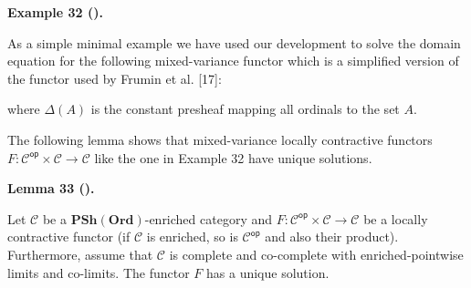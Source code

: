 \documentclass[10pt,a4paper]{article}
\begin{document}
 
 
\par\medskip\noindent\textbf{Example 32 ().}\par
 
 
As a simple minimal example we have used our development to solve the domain equation for the following mixed-variance functor which is a simplified version of the functor used by Frumin et al. [17]:\par
 
\begin{center}\end{center}
 
where $\Delta(A)$ is the constant presheaf mapping all ordinals to the set $A$.\par
 
 
 
 
The following lemma shows that mixed-variance locally contractive functors $F:{\mathcal{C}}^{\mathsf{op}}\times\mathcal{C}\to\mathcal{C}$ like the one in Example 32 have unique solutions.\par
 
 
 
\par\medskip\noindent\textbf{Lemma 33 ().}\par
 
 
Let $\mathcal{C}$ be a $\mathbf{PSh}(\mathbf{Ord})$-enriched category and $F:{\mathcal{C}}^{\mathsf{op}}\times\mathcal{C}\to\mathcal{C}$ be a locally contractive functor (if $\mathcal{C}$ is enriched, so is ${\mathcal{C}}^{\mathsf{op}}$ and also their product). Furthermore, assume that $\mathcal{C}$ is complete and co-complete with enriched-pointwise limits and co-limits. The functor $F$ has a unique solution.\par
 
 
 
\end{document}
